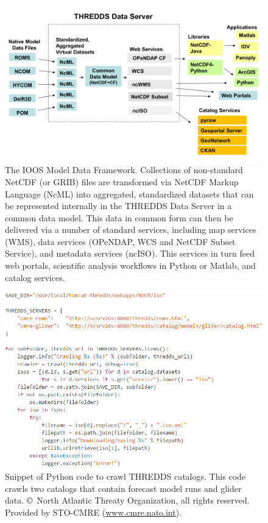 \documentclass[osd, online, hvmath]{copernicus}
\begin{document}
\begin{figure}
\includegraphics[width=130mm]{framework_slide.png}
\caption{The IOOS Model Data Framework.  Collections of non-standard NetCDF (or GRIB) files are transformed via NetCDF Markup Language (NcML) into aggregated, standardized datasets that can be represented internally in the THREDDS Data Server in a common data model.  This data in common form can then be delivered via a number of standard services, including map services (WMS), data services (OPeNDAP, WCS and NetCDF Subset Service), and metadata services (ncISO).  This services in turn feed web portals, scientific analysis workflows in Python or Matlab,  and catalog services. }
\label{osd-2015-0064-f00.pdf}
\end{figure}


\begin{figure}
\includegraphics[width=130mm]{os-2015-64-discussions-f01.png}
\caption{Snippet of Python code to crawl THREDDS catalogs. This code
  crawls two catalogs that contain forecast model runs and glider
  data. \copyright~North Atlantic Threaty Organization, all rights reserved. Provided by STO-CMRE (\url{www.cmre.nato.int}).}
\label{osd-2015-0064-f01.pdf}
\end{figure}
\end{document}
